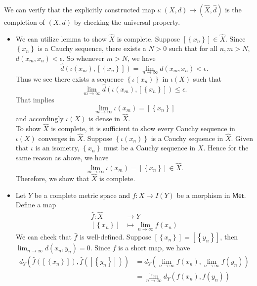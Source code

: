 \documentclass{report}
\begin{document}
\begin{prf}
	We can verify that the explicitly constructed map $\iota:(X,d)\to\left(\widehat{X},\hat{d}\right)$ is the completion of $(X,d)$ by checking the universal property.
	\begin{itemize}
		\item We can utilize lemma to show $\widehat{X}$ is complete. Suppose $\left[\left\{x_n\right\}\right]\in \widehat{X}$. Since $\left\{x_n\right\}$ is a Cauchy sequence, there exists a $N>0$ such that for all $n,m>N$, $d(x_m,x_n)<\epsilon$. So whenever $m>N$, we have
		      \[
			      \hat{d}\left(\iota\left(x_m\right),[\left\{x_n\right\}]\right)=\lim_{n\to\infty}d(x_m,x_n)<\epsilon.
		      \]
		      Thus we see there exists a sequence $\left\{\iota(x_n)\right\}$ in $\iota(X)$ such that
		      \[
			      \lim_{m\to \infty}\hat{d}\left(\iota\left(x_m\right),[\left\{x_n\right\}]\right)\le \epsilon.
		      \]
		      That implies
		      \[
			      \lim_{m\to \infty}\iota\left(x_m\right)= [\left\{x_n\right\}]
		      \]
		      and accordingly $\iota\left(X\right)$ is dense in $\widehat{X}$.\\
		      To show $\widehat{X}$ is complete, it is sufficient to show every Cauchy sequence in $\iota(X)$ converges in $\widehat{X}$. Suppose $\left\{\iota(x_n)\right\}$ is a Cauchy sequence in $\widehat{X}$. Given that $\iota$ is an isometry, $\left\{x_n\right\}$ must be a Cauchy sequence in $X$. Hence for the same reason as above, we have
		      \[
			      \lim_{m\to \infty}\iota\left(x_m\right)= [\left\{x_n\right\}]\in \widehat{X}.
		      \]
		      Therefore, we show that $\widehat{X}$ is complete.
		\item Let $Y$ be a complete metric space and $f:X\to I(Y)$ be a morphism in $\mathsf{Met}$. Define a map
		      \begin{align*}
			      \hat{f}:\widehat{X}  & \longrightarrow Y                  \\
			      [\left\{x_n\right\}] & \longmapsto\lim_{n\to\infty}f(x_n)
		      \end{align*}
		      We can check that $\hat{f}$ is well-defined. Suppose $[\left\{x_n\right\}]=[\left\{y_n\right\}]$, then $\lim_{n\to\infty}d(x_n,y_n)=0$. Since $f$ is a short map, we have
		      \begin{align*}
			      d_Y\left(\hat{f}\left([\left\{x_n\right\}]\right),\hat{f}\left([\left\{y_n\right\}]\right)\right) & =d_Y\left(\lim_{n\to\infty}f(x_n),\lim_{n\to\infty}f(y_n)\right) \\
			                                                                                                        & =\lim_{n\to\infty}d_Y(f(x_n),f(y_n))                             \\

\end{align*}
\end{itemize}
\end{prf}
\end{document}
